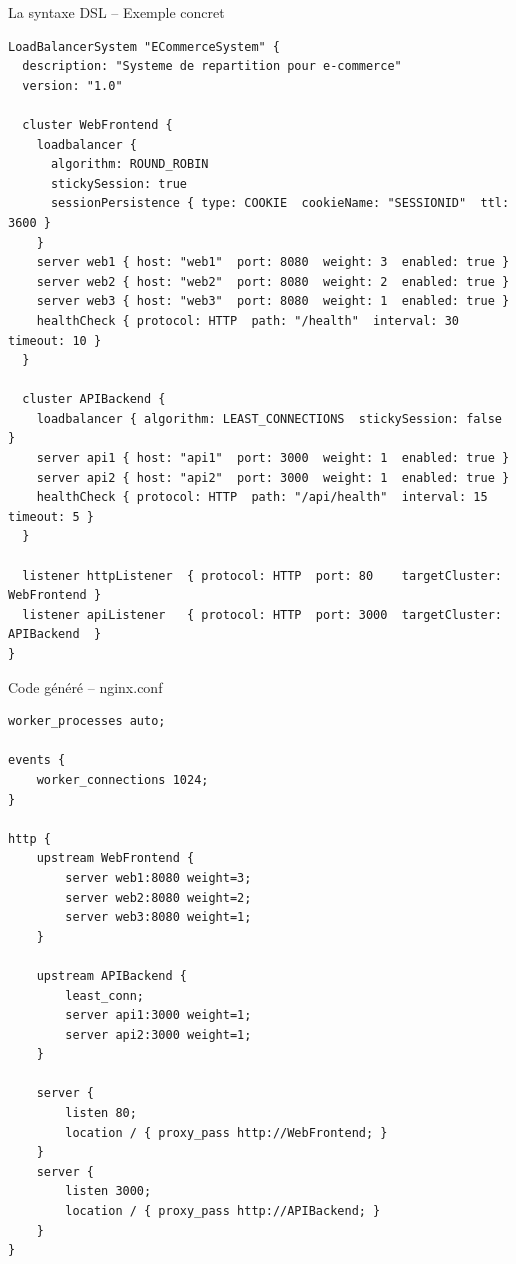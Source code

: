 \documentclass[aspectratio=169,12pt]{beamer}
\begin{document}
\begin{frame}[fragile]{La syntaxe DSL -- Exemple concret}
\begin{lstlisting}[language=DSL]
LoadBalancerSystem "ECommerceSystem" {
  description: "Systeme de repartition pour e-commerce"
  version: "1.0"

  cluster WebFrontend {
    loadbalancer {
      algorithm: ROUND_ROBIN
      stickySession: true
      sessionPersistence { type: COOKIE  cookieName: "SESSIONID"  ttl: 3600 }
    }
    server web1 { host: "web1"  port: 8080  weight: 3  enabled: true }
    server web2 { host: "web2"  port: 8080  weight: 2  enabled: true }
    server web3 { host: "web3"  port: 8080  weight: 1  enabled: true }
    healthCheck { protocol: HTTP  path: "/health"  interval: 30  timeout: 10 }
  }

  cluster APIBackend {
    loadbalancer { algorithm: LEAST_CONNECTIONS  stickySession: false }
    server api1 { host: "api1"  port: 3000  weight: 1  enabled: true }
    server api2 { host: "api2"  port: 3000  weight: 1  enabled: true }
    healthCheck { protocol: HTTP  path: "/api/health"  interval: 15  timeout: 5 }
  }

  listener httpListener  { protocol: HTTP  port: 80    targetCluster: WebFrontend }
  listener apiListener   { protocol: HTTP  port: 3000  targetCluster: APIBackend  }
}
\end{lstlisting}
\end{frame}

\begin{frame}[fragile]{Code généré -- nginx.conf}
\begin{lstlisting}[language={},morekeywords={worker_processes,events,worker_connections,http,upstream,server,listen,location,proxy_pass,least_conn,weight}]
worker_processes auto;

events {
    worker_connections 1024;
}

http {
    upstream WebFrontend {
        server web1:8080 weight=3;
        server web2:8080 weight=2;
        server web3:8080 weight=1;
    }

    upstream APIBackend {
        least_conn;
        server api1:3000 weight=1;
        server api2:3000 weight=1;
    }

    server {
        listen 80;
        location / { proxy_pass http://WebFrontend; }
    }
    server {
        listen 3000;
        location / { proxy_pass http://APIBackend; }
    }
}
\end{lstlisting}
\end{frame}
\end{document}

